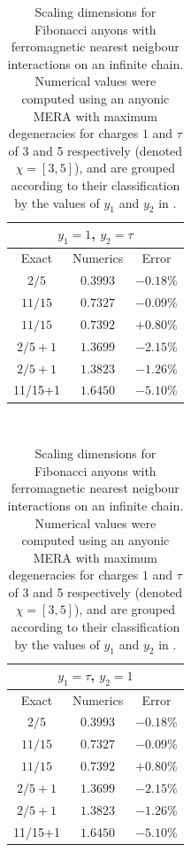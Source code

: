 \documentclass[aps,prb,reprint,superscriptaddress,amsfonts,amsmath,amssymb,showpacs,floatfix]{revtex4-1}
\newcommand{\fref}[1]{Fig.~\ref{#1}}
\begin{document}
\begin{table}
\begin{tabular}{|c|c|c|}
\hline
\multicolumn{3}{|c|}{$y_1=1$, $y_2=\tau$}\\
\hline\hline
Exact & Numerics & Error \\
\hline
$2/5$ & $0.3993$ & $-0.18\%$\\     %
$11/15$   & $0.7327$ & $-0.09\%$\\ %
$11/15$ & $0.7392$ & $+0.80\%$\\
$2/5+1$ & $1.3699$ & $-2.15\%$\\
$2/5+1$ & $1.3823$ & $-1.26\%$\\
11/15+1 & $1.6450$ & $-5.10\%$\\
\hline
\end{tabular}
~
\begin{tabular}{|c|c|c|}
\hline
\multicolumn{3}{|c|}{$y_1=\tau$, $y_2=1$}\\
\hline\hline
Exact & Numerics & Error \\
\hline
$2/5$ & $0.3993$ & $-0.18\%$\\
$11/15$   & $0.7327$ & $-0.09\%$\\
$11/15$ & $0.7392$ & $+0.80\%$\\
$2/5+1$ & $1.3699$ & $-2.15\%$\\
$2/5+1$ & $1.3823$ & $-1.26\%$\\
11/15+1 & $1.6450$ & $-5.10\%$\\
\hline
\end{tabular}
\caption{Scaling dimensions for Fibonacci anyons with ferromagnetic nearest neigbour interactions on an infinite chain. Numerical values were computed using an anyonic MERA with maximum degeneracies for charges $1$ and $\tau$ of 3 and 5 respectively (denoted $\chi=[3,5]$), and are grouped according to their classification by the values of $y_1$ and $y_2$ in \protect{\fref{fig:scalingsuperop}}. %
\label{tab:results2}}
\end{table}
\end{document}

